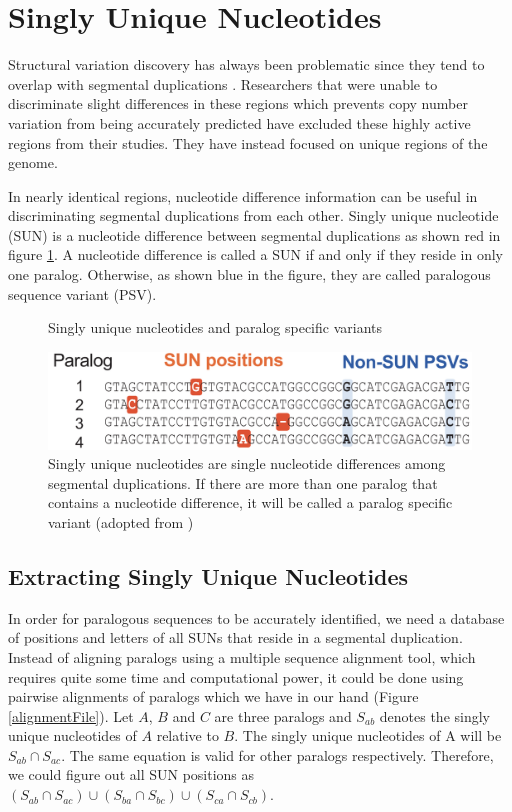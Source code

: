 \section{Singly Unique Nucleotides} \label{section:sun}
Structural variation discovery has always been problematic since they tend to overlap with segmental duplications \cite{sudmant2010diversity}. Researchers that were unable to discriminate slight differences in these regions which prevents copy number variation from being accurately predicted have excluded these highly active regions from their studies. They have instead focused on unique regions of the genome.

In nearly identical regions, nucleotide difference information can be useful in discriminating segmental duplications from each other. Singly unique nucleotide (SUN) is a nucleotide difference between segmental duplications as shown red in figure \ref{singlyUniqueNucleotide}. A nucleotide difference is called a SUN if and only if they reside in only one paralog. Otherwise, as shown blue in the figure, they are called  paralogous sequence variant (PSV). 
\begin{figure}[ht]
    \centering
    \caption{Singly unique nucleotides and paralog specific variants}
    \includegraphics[scale=0.4]{images/singlyUniqueNucleotide.png}
    \caption*{Singly unique nucleotides are single nucleotide differences among segmental duplications. If there are more than one paralog that contains a nucleotide difference, it will be called a paralog specific variant (adopted from \cite{sudmant2010diversity})}
    \label{singlyUniqueNucleotide}
\end{figure}

\subsection{Extracting Singly Unique Nucleotides}
In order for paralogous sequences to be accurately identified, we need a database of positions and letters of all SUNs that reside in a segmental duplication. Instead of aligning paralogs using a multiple sequence alignment tool, which requires quite some time and computational power, it could be done using pairwise alignments of paralogs which we have in our hand (Figure \ref{alignmentFile}). Let $A$, $B$ and $C$ are three paralogs and  $S_{ab}$ denotes the singly unique nucleotides of $A$ relative to $B$. The singly unique nucleotides of A will be $S_{ab} \cap S_{ac}$. The same equation is valid for other paralogs respectively. Therefore, we could figure out all SUN positions as $(S_{ab} \cap S_{ac}) \cup (S_{ba} \cap S_{bc}) \cup (S_{ca} \cap S_{cb})$.

